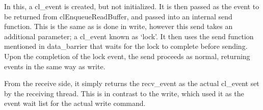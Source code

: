 \documentclass[../thesis.tex]{subfiles}
\begin{document}
            In this, a cl\_event is created, but not initialized. It is then passed as the event to be returned from clEnqueueReadBuffer, and passed into an internal send function. This is the same as is done in write, however this send takes an additional parameter; a cl\_event known as `lock'. It then uses the send function mentioned in data\_barrier that waits for the lock to complete before sending. Upon the completion of the lock event, the send proceeds as normal, returning events in the same way as write.

            From the receive side, it simply returns the recv\_event as the actual cl\_event set by the receiving thread. This is in contrast to the write, which used it as the event wait list for the actual write command.
    


\end{document}

